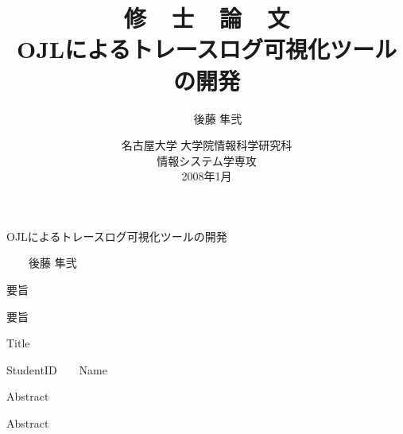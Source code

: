 \documentclass[a4paper,12pt]{jreport}
\title{
{\LARGE\sffamily\gtfamily
修\ \ 士\ \ 論\ \ 文\\
}
\vspace*{.6in}
{\huge\sffamily\gtfamily
OJLによるトレースログ可視化ツールの開発\\
}
\vfill\vfill\vfill
}
\author{
\LARGE\sffamily\gtfamily
350702101\ \ \ \ 後藤 隼弐\\
}
\date{
\vfill
\Large\sffamily\gtfamily
名古屋大学 大学院情報科学研究科\\[.2in]
情報システム学専攻\\[.2in]
2008年1月
\vfill
}
\begin{document}
\pagestyle{empty}
\vspace*{-1in}
\begin{center}
\Large\sffamily\gtfamily OJLによるトレースログ可視化ツールの開発
\end{center}
\begin{flushright}
\large\sffamily{}\ \ \ \ 後藤 隼弐
\end{flushright}
\begin{center}
\large\sffamily\gtfamily 要旨
\end{center}

要旨

\clearpage

\vspace*{-1in}
\begin{center}
\Large\sffamily
Title
\end{center}
\begin{flushright}
\large\sffamily\gtfamily
StudentID\ \ \ \ Name
\end{flushright}
\begin{center}
\large\sffamily Abstract
\end{center}

Abstract

\clearpage

\maketitle
\clearpage

\pagestyle{plain} 
\setcounter{page}{1}
\tableofcontents
\clearpage

\pagestyle{plain} 
\setcounter{page}{1}
\end{document}
